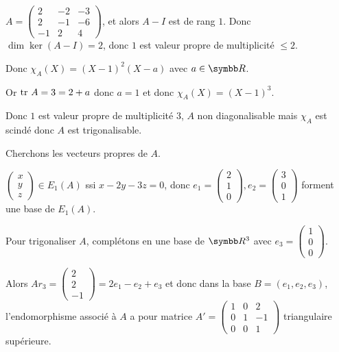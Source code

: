 \begin{exemple}
    $A = \begin{pmatrix}
        2 & -2 & -3 \\
        2 & -1 & -6 \\
        -1 & 2 & 4
    \end{pmatrix}$, et alors $A - I$ est de rang $1$. Donc $\dim \ker (A - I) = 2$, donc 
    $1$ est valeur propre de multiplicité $\leqslant 2$.

    Donc $\chi_A(X) = (X - 1)^2 (X - a)$ avec $a \in \R$.

    Or $\operatorname{tr} \, A = 3 = 2 + a$ donc $a = 1$ et donc $\chi_A(X) = (X - 1)^3$.

    Donc $1$ est valeur propre de multiplicité $3$, $A$ non diagonalisable
    mais $\chi_A$ est scindé donc $A$ est trigonalisable.

    \avspace Cherchons les vecteurs propres de $A$. 

    $\begin{pmatrix}
        x \\
        y \\
        z
    \end{pmatrix} \in E_1(A)$ ssi $x - 2y - 3z = 0$, donc $e_1 = \begin{pmatrix}
        2 \\
        1 \\
        0
    \end{pmatrix}, e_2 = \begin{pmatrix}
        3 \\
        0 \\
        1
    \end{pmatrix}$ forment une base de $E_1(A)$.

    Pour trigonaliser $A$, complétons en une base de $\R^3$ avec $e_3 = \begin{pmatrix}
        1 \\
        0 \\
        0
    \end{pmatrix}$.

    Alors $Ar_3 = \begin{pmatrix}
        2 \\
        2 \\
        -1
    \end{pmatrix} = 2 e_1 - e_2 + e_3$ 
    et donc dans la base $B = (e_1, e_2, e_3)$, l'endomorphisme associé à $A$ a pour matrice 
    $A' = \begin{pmatrix}
        1 & 0 & 2 \\
        0 & 1 & -1 \\
        0 & 0 & 1
    \end{pmatrix}$ triangulaire supérieure.
\end{exemple}


